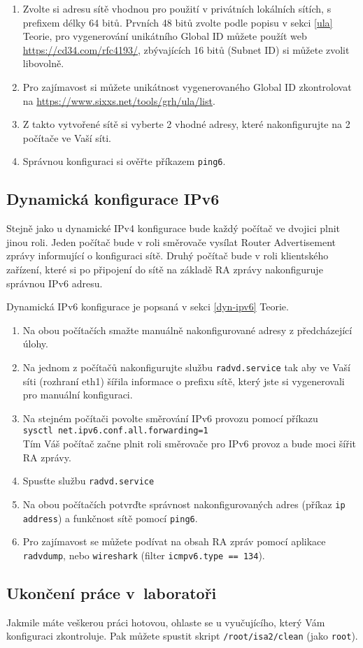 \begin{enumerate}
    \item Zvolte si adresu sítě vhodnou pro použití v privátních lokálních
        sítích, s prefixem délky 64 bitů. Prvních 48 bitů zvolte podle popisu v
        sekci \ref{ula} Teorie, pro vygenerování unikátního Global ID můžete
        použít web \url{https://cd34.com/rfc4193/}, zbývajících 16 bitů (Subnet
        ID) si můžete zvolit libovolně.
    \item Pro zajímavost si můžete unikátnost vygenerovaného Global ID
        zkontrolovat na \url{https://www.sixxs.net/tools/grh/ula/list}.
    \item Z takto vytvořené sítě si vyberte 2 vhodné adresy, které
        nakonfigurujte na 2 počítače ve Vaší síti.
    \item Správnou konfiguraci si ověřte příkazem {\tt ping6}.
\end{enumerate}

\subsection{Dynamická konfigurace IPv6}
Stejně jako u dynamické IPv4 konfigurace bude každý počítač ve dvojici plnit
jinou roli. Jeden počítač bude v roli směrovače vysílat Router Advertisement
zprávy informující o konfiguraci sítě. Druhý počítač bude v roli klientského
zařízení, které si po připojení do sítě na základě RA zprávy nakonfiguruje
správnou IPv6 adresu.

Dynamická IPv6 konfigurace je popsaná v sekci \ref{dyn-ipv6} Teorie.

\begin{enumerate}
    \item Na obou počítačích smažte manuálně nakonfigurované adresy z
        předcházející úlohy.
    \item Na jednom z počítačů nakonfigurujte službu \texttt{radvd.service} tak
        aby ve Vaší síti (rozhraní eth1) šířila informace o prefixu sítě, který
        jste si vygenerovali pro manuální konfiguraci.
    \item Na stejném počítači povolte směrování IPv6 provozu pomocí příkazu\\
        \texttt{sysctl net.ipv6.conf.all.forwarding=1}\\
        Tím Váš počítač začne plnit roli směrovače pro IPv6 provoz a bude moci
        šířit RA zprávy.
    \item Spusťte službu \texttt{radvd.service}
    \item Na obou počítačích potvrďte správnost nakonfigurovaných adres (příkaz
        \texttt{ip address}) a funkčnost sítě pomocí \texttt{ping6}.
    \item Pro zajímavost se můžete podívat na obsah RA zpráv pomocí aplikace
        \texttt{radvdump}, nebo \texttt{wireshark} (filter \texttt{icmpv6.type
        == 134}).
\end{enumerate}

\subsection{Ukončení práce v~laboratoři}
Jakmile máte veškerou práci hotovou, ohlaste se u vyučujícího, který Vám
konfiguraci zkontroluje. Pak můžete spustit skript {\tt /root/isa2/clean} (jako
\texttt{root}).
